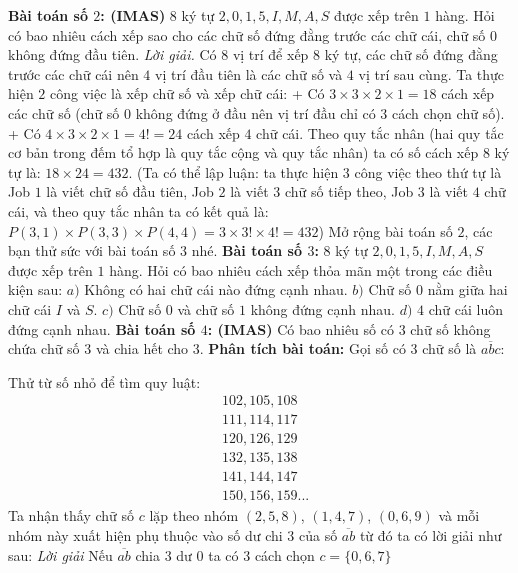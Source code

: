 \begin{multicols}{2}
	\textbf{Bài toán số $2$: (IMAS)}
	\vskip 0.1cm
	$8$ ký tự $2,0,1,5,I,M,A,S$ được xếp trên $1$ hàng. Hỏi có bao nhiêu cách xếp sao cho các chữ số đứng đằng trước các chữ cái, chữ số $0$ không đứng đầu tiên.
	\vskip 0.1cm
	\textit{Lời giải.}
	Có $8$ vị trí để xếp $8$ ký tự, các chữ số đứng đằng trước các chữ cái nên $4$ vị trí đầu tiên là các chữ số và $4$ vị trí sau cùng. Ta thực hiện $2$ công việc là xếp chữ số và xếp chữ cái:
	\vskip 0.1cm
	+ Có $3\times3\times2\times1=18$ cách xếp các chữ số (chữ số $0$ không đứng ở đầu nên vị trí đầu chỉ có $3$ cách chọn chữ số).
	\vskip 0.1cm
	+ Có $4\times3\times2\times1=4!=24$ cách xếp $4$ chữ cái.
	\vskip 0.1cm
	Theo quy tắc nhân (hai quy tắc cơ bản trong đếm tổ hợp là quy tắc cộng và quy tắc nhân) ta có số cách xếp $8$ ký tự là: $18\times24=432$.
	\vskip 0.1cm
	(Ta có thể lập luận: ta thực hiện $3$ công việc theo thứ tự là Job $1$ là viết chữ số đầu tiên, Job $2$ là viết $3$ chữ số tiếp theo, Job $3$ là viết $4$ chữ cái, và theo quy tắc nhân ta có kết quả là: $P(3,1)\times P(3,3)\times P(4,4)=3\times3!\times4!=432$)
	\vskip 0.1cm
	Mở rộng bài toán số $2$, các bạn thử sức với bài toán số $3$ nhé.
	\vskip 0.1cm
	\textbf{Bài toán số $3$:}
	\vskip 0.1cm
	$8$ ký tự $2,0,1,5,I,M,A,S$ được xếp trên $1$ hàng. Hỏi có bao nhiêu cách xếp thỏa mãn một trong các điều kiện sau:
	\vskip 0.1cm
	$a)$ Không có hai chữ cái nào đứng cạnh nhau.
	\vskip 0.1cm
	$b)$ Chữ số $0$ nằm giữa hai chữ cái $I$ và $S$.
	\vskip 0.1cm
	$c)$ Chữ số $0$ và chữ số $1$ không đứng cạnh nhau.
	\vskip 0.1cm
	$d)$ $4$ chữ cái luôn đứng cạnh nhau.
	\vskip 0.1cm
	\textbf{Bài toán số $4$: (IMAS)}
	\vskip 0.1cm
	Có bao nhiêu số có $3$ chữ số không chứa chữ số $3$ và chia hết cho $3$.
	\vskip 0.1cm
	\textbf{Phân tích bài toán:}
	\vskip 0.1cm
	Gọi số có $3$ chữ số là $\overline{abc}$:
	\begin{multicols}{2}
		Thử từ số nhỏ để tìm quy luật:
		\begin{align*}
			&102, 105, 108\\
			&111, 114, 117\\
			&120, 126, 129\\
			&132, 135, 138\\
			&141, 144, 147\\
			&150, 156, 159...
		\end{align*}
		Ta nhận thấy chữ số $c$ lặp theo nhóm $(2,5,8)$, $(1,4,7)$, $(0,6,9)$ và mỗi nhóm này xuất hiện phụ thuộc vào số dư chi $3$ của số $\overline{ab}$ từ đó ta có lời giải như sau:
		\vskip 0.1cm
		\textit{Lời giải}
		\vskip 0.1cm
		Nếu $\overline{ab}$ chia $3$ dư $0$ ta có $3$ cách chọn $c=\{0,6,7\}$

\end{multicols}
\end{multicols}
